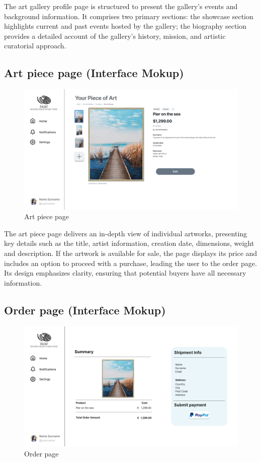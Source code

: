 The art gallery profile page is structured to present the gallery’s events and background information. 
It comprises two primary sections: the showcase section highlights current and past events hosted by the gallery; the biography section provides a detailed account of the gallery’s history, mission, and artistic curatorial approach.

\subsection{Art piece page (Interface Mokup)}
\begin{figure}[H]
    \centering
    \includegraphics[width=\myfigwidth]{images/interface_mockups/Art piece page.pdf}
    \caption{Art piece page}
\end{figure}

The art piece page delivers an in-depth view of individual artworks, presenting key details such as the title, artist information, creation date, dimensions, weight and description. 
If the artwork is available for sale, the page displays its price and includes an option to proceed with a purchase, leading the user to the order page. 
Its design emphasizes clarity, ensuring that potential buyers have all necessary information.

\subsection{Order page (Interface Mokup)}
\begin{figure}[H]
    \centering
    \includegraphics[width=\myfigwidth]{images/interface_mockups/Order page.pdf}
    \caption{Order page}
\end{figure}

